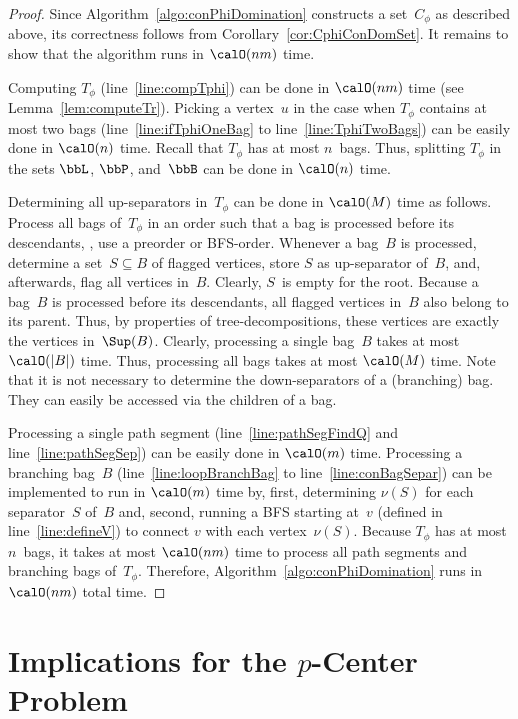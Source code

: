 \begin{proof}
Since Algorithm~\ref{algo:conPhiDomination} constructs a set~$C_\phi$ as described above, its correctness follows from Corollary~\ref{cor:CphiConDomSet}.
It remains to show that the algorithm runs in $\calO(nm)$ time.

Computing $T_\phi$ (line~\ref{line:compTphi}) can be done in $\calO(nm)$ time (see Lemma~\ref{lem:computeTr}).
Picking a vertex~$u$ in the case when $T_\phi$ contains at most two bags (line~\ref{line:ifTphiOneBag} to line~\ref{line:TphiTwoBags}) can be easily done in $\calO(n)$ time.
Recall that $T_\phi$ has at most $n$~bags.
Thus, splitting $T_\phi$ in the sets $\bbL$, $\bbP$, and~$\bbB$ can be done in $\calO(n)$ time.

Determining all up-separators in~$T_\phi$ can be done in $\calO(M)$ time as follows.
Process all bags of~$T_\phi$ in an order such that a bag is processed before its descendants, \eg, use a preorder or BFS-order.
Whenever a bag~$B$ is processed, determine a set~$S \subseteq B$ of flagged vertices, store $S$ as up-separator of~$B$, and, afterwards, flag all vertices in~$B$.
Clearly, $S$~is empty for the root.
Because a bag~$B$ is processed before its descendants, all flagged vertices in~$B$ also belong to its parent.
Thus, by properties of tree-decompositions, these vertices are exactly the vertices in~$\Sup(B)$.
Clearly, processing a single bag~$B$ takes at most $\calO(|B|)$ time.
Thus, processing all bags takes at most $\calO(M)$ time.
Note that it is not necessary to determine the down-separators of a (branching) bag.
They can easily be accessed via the children of a bag.

Processing a single path segment (line~\ref{line:pathSegFindQ} and line~\ref{line:pathSegSep}) can be easily done in $\calO(m)$ time.
Processing a branching bag~$B$ (line~\ref{line:loopBranchBag} to line~\ref{line:conBagSepar}) can be implemented to run in $\calO(m)$ time by, first, determining $\nu(S)$ for each separator~$S$ of~$B$ and, second, running a BFS starting at~$v$ (defined in line~\ref{line:defineV}) to connect $v$ with each vertex~$\nu(S)$.
Because $T_\phi$ has at most $n$~bags, it takes at most $\calO(nm)$ time to process all path segments and branching bags of~$T_\phi$.
Therefore, Algorithm~\ref{algo:conPhiDomination} runs in \( \calO(nm) \) total time.
\end{proof}

\section{Implications for the $p$-Center Problem}

